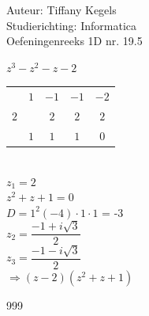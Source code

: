 \documentclass[a4paper]{article}
\begin{document}
  
\noindent \large Auteur: Tiffany Kegels \\
\noindent \large Studierichting: Informatica\\
\noindent \large Oefeningenreeks 1D nr. 19.5\\

\medskip

\normalsize

$z^3 - z^2 - z - 2$\\

\begin{tabular}{c|cccc}
    & $1$ & $-1$ & $-1$ & $-2$\\
$2$ &     & $2$  & $2$  & $2$\\ \hline
    & $1$ & $1$  & $1$  & \vline $0$ \\
\end{tabular}\\

$z_1 = 2$\\

$z^2 + z +1 = 0$\\

$D = 1^2 (-4) \cdot 1 \cdot 1$ = -3\\

$z_2 = \dfrac{-1 + i\sqrt{3}}{2}$\\

$z_3 = \dfrac{-1 -i\sqrt{3}}{2}$\\

$\Rightarrow (z-2)(z^2 + z + 1)$\\

\begin{thebibliography}{999}

\end{thebibliography}
\end{document}
